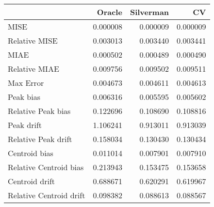 \begin{tabular}{lrrr}
  \hline
 & Oracle & Silverman & CV \\ 
  \hline
MISE & 0.000008 & 0.000009 & 0.000009 \\ 
  Relative MISE & 0.003013 & 0.003440 & 0.003441 \\ 
  MIAE & 0.000502 & 0.000489 & 0.000490 \\ 
  Relative MIAE & 0.009756 & 0.009502 & 0.009511 \\ 
  Max Error & 0.004673 & 0.004611 & 0.004613 \\ 
  Peak bias & 0.006316 & 0.005595 & 0.005602 \\ 
  Relative Peak bias & 0.122696 & 0.108690 & 0.108816 \\ 
  Peak drift & 1.106241 & 0.913011 & 0.913039 \\ 
  Relative Peak drift & 0.158034 & 0.130430 & 0.130434 \\ 
  Centroid bias & 0.011014 & 0.007901 & 0.007910 \\ 
  Relative Centroid bias & 0.213943 & 0.153475 & 0.153658 \\ 
  Centroid drift & 0.688671 & 0.620291 & 0.619967 \\ 
  Relative Centroid drift & 0.098382 & 0.088613 & 0.088567 \\ 
   \hline
\end{tabular}
